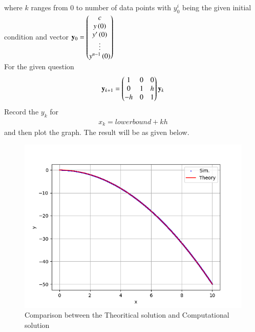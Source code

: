 \documentclass[journal]{IEEEtran}
\begin{document}
where $k$ ranges from 0 to number of data points with $y^{i}_0$ being the given initial condition and vector $\mathbf{y}_0 = \begin{pmatrix}c\\y\left(0\right)\\y^\prime\left(0\right)\\\vdots\\y^{n-1}\left(0\right)\end{pmatrix}$\\
For the given question\\
\begin{align}
	\mathbf{y}_{k+1} = \begin{pmatrix}1 & 0 & 0\\ 0 & 1 & h\\ -h & 0 & 1\end{pmatrix}\mathbf{y}_k
\end{align}
Record the $y_k$ for 
\begin{align}
x_k =lowerbound+kh
\end{align}
and then plot the graph. The result will be as given below.
\begin{figure}[h!]
   \centering
   \includegraphics[width=\columnwidth]{figs/fig.png}
   \caption{Comparison between the Theoritical solution and Computational solution}
   \label{stemplot}
\end{figure}
\end{document}
